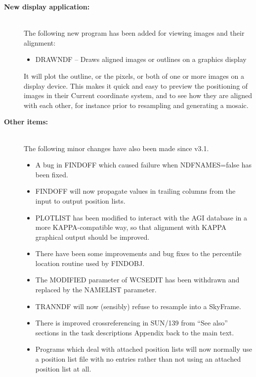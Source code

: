\documentclass[twoside,11pt]{article}
\newcommand{\htmlref}[2]{#1}
\newcommand{\xref}[3]{#1}
\renewcommand{\_}{\texttt{\symbol{95}}}
\newcommand{\xroutine}[1]{\htmlref{{\sc #1}}{#1}}
\begin{document}
\begin{description}
  \item[{\bf New display application:}]\mbox{}\\
     The following new program has been added for viewing images and
     their alignment:
     \begin{itemize}
     \item \xroutine{DRAWNDF} -- 
           Draws aligned images or outlines on a graphics display
     \end{itemize}
     It will plot the outline, or the pixels, or both of one or more
     images on a display device.  This makes it quick and easy to preview
     the positioning of images in their Current coordinate system,
     and to see how they are aligned with each other, for instance prior
     to resampling and generating a mosaic.

  \item[{\bf Other items:}]\mbox{}\\
     The following minor changes have also been made since v3.1.
     \begin{itemize}
      \item
        A bug in \xroutine{FINDOFF} which caused failure when NDFNAMES=false has
        been fixed.

      \item
        \xroutine{FINDOFF} will now 
        propagate values in trailing columns from the
        input to output position lists.

      \item
        \xroutine{PLOTLIST} has been modified to interact with the 
        \xref{AGI}{sun48}{} database
        in a more \xref{KAPPA}{sun95}{}-compatible way, so that 
        alignment with KAPPA
        graphical output should be improved.

      \item
        There have been some improvements and bug fixes to the percentile
        location routine used by \xroutine{FINDOBJ}.

      \item
        The MODIFIED parameter of \xroutine{WCSEDIT} 
        has been withdrawn and replaced
        by the NAMELIST parameter.

      \item
        \xroutine{TRANNDF} will now (sensibly) 
        refuse to resample into a SkyFrame.

     \item
        There is improved crossreferencing in \xref{SUN/139}{sun139}{}
        from ``See also'' sections in the
        \htmlref{task descriptions Appendix}{descriptions} 
        back to the main text.

     \item
        Programs which deal with attached position lists will now normally
        use a position list file with no entries rather than not using
        an attached position list at all.

     \end{itemize}

  \end{description}
\end{document}

